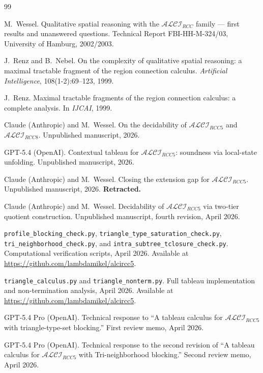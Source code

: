 \documentclass[a4paper,11pt]{article}
\theoremstyle{definition}
\newcommand{\ALCI}{\ensuremath{\mathcal{ALCI}}}
\newcommand{\ALCIRCC}[1]{\ensuremath{\mathcal{ALCI}_{\mathit{RCC#1}}}}
\begin{document}
\begin{thebibliography}{99}

M.~Wessel.
\newblock Qualitative spatial reasoning with the $\ALCI_{\mathit{RCC}}$
  family --- first results and unanswered questions.
\newblock Technical Report FBI-HH-M-324/03, University of Hamburg, 2002/2003.

J.~Renz and B.~Nebel.
\newblock On the complexity of qualitative spatial reasoning: a maximal
  tractable fragment of the region connection calculus.
\newblock \emph{Artificial Intelligence}, 108(1-2):69--123, 1999.

J.~Renz.
\newblock Maximal tractable fragments of the region connection calculus: a
  complete analysis.
\newblock In \emph{IJCAI}, 1999.

Claude (Anthropic) and M.~Wessel.
\newblock On the decidability of $\ALCIRCC{5}$ and $\ALCIRCC{8}$.
\newblock Unpublished manuscript, 2026.

GPT-5.4 (OpenAI).
\newblock Contextual tableau for $\ALCIRCC{5}$: soundness via local-state
  unfolding.
\newblock Unpublished manuscript, 2026.

Claude (Anthropic) and M.~Wessel.
\newblock Closing the extension gap for $\ALCIRCC{5}$.
\newblock Unpublished manuscript, 2026.
\newblock \textbf{Retracted.}

Claude (Anthropic) and M.~Wessel.
\newblock Decidability of $\ALCIRCC{5}$ via two-tier quotient construction.
\newblock Unpublished manuscript, fourth revision, April 2026.

\texttt{profile\_blocking\_check.py},
\texttt{triangle\_type\_saturation\_check.py},
\texttt{tri\_neighborhood\_check.py}, and
\texttt{intra\_subtree\_tclosure\_check.py}.
\newblock Computational verification scripts, April 2026.
\newblock Available at
  \url{https://github.com/lambdamikel/alcircc5}.

\texttt{triangle\_calculus.py} and
\texttt{triangle\_nonterm.py}.
\newblock Full tableau implementation and non-termination analysis,
  April 2026.
\newblock Available at
  \url{https://github.com/lambdamikel/alcircc5}.

GPT-5.4 Pro (OpenAI).
\newblock Technical response to ``A tableau calculus for
  $\ALCIRCC{5}$ with triangle-type-set blocking.''
\newblock First review memo, April 2026.

GPT-5.4 Pro (OpenAI).
\newblock Technical response to the second revision of ``A
  tableau calculus for $\ALCIRCC{5}$ with Tri-neighborhood
  blocking.''
\newblock Second review memo, April 2026.

\end{thebibliography}
\end{document}
